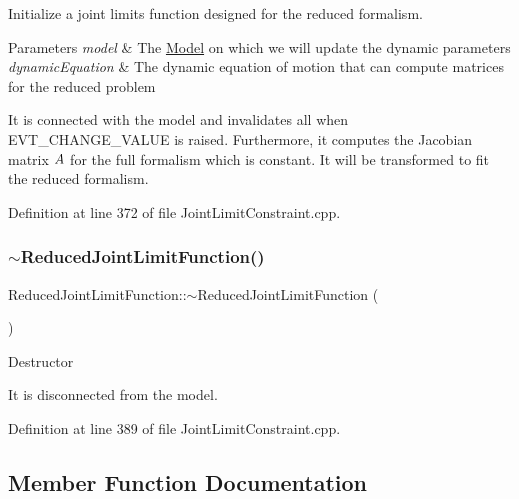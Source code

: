 Initialize a joint limits function designed for the reduced formalism.


\begin{DoxyParams}{Parameters}
{\em model} & The \hyperlink{classocra_1_1Model}{Model} on which we will update the dynamic parameters \\
\hline
{\em dynamic\+Equation} & The dynamic equation of motion that can compute matrices for the reduced problem\\
\hline
\end{DoxyParams}
It is connected with the model and invalidates all when E\+V\+T\+\_\+\+C\+H\+A\+N\+G\+E\+\_\+\+V\+A\+L\+UE is raised. Furthermore, it computes the Jacobian matrix $ A $ for the full formalism which is constant. It will be transformed to fit the reduced formalism. 

Definition at line 372 of file Joint\+Limit\+Constraint.\+cpp.

\hypertarget{classocra_1_1ReducedJointLimitFunction_a96e9196a18c5eb5e92672b45a7491c65}{}\label{classocra_1_1ReducedJointLimitFunction_a96e9196a18c5eb5e92672b45a7491c65} 
\subsubsection{\texorpdfstring{$\sim$\+Reduced\+Joint\+Limit\+Function()}{~ReducedJointLimitFunction()}}
{\footnotesize\ttfamily Reduced\+Joint\+Limit\+Function\+::$\sim$\+Reduced\+Joint\+Limit\+Function (\begin{DoxyParamCaption}{ }\end{DoxyParamCaption})}

Destructor

It is disconnected from the model. 

Definition at line 389 of file Joint\+Limit\+Constraint.\+cpp.



\subsection{Member Function Documentation}
\hypertarget{classocra_1_1ReducedJointLimitFunction_aaf30e3ac7c3053707a04a147b545126c}{}\label{classocra_1_1ReducedJointLimitFunction_aaf30e3ac7c3053707a04a147b545126c} 
